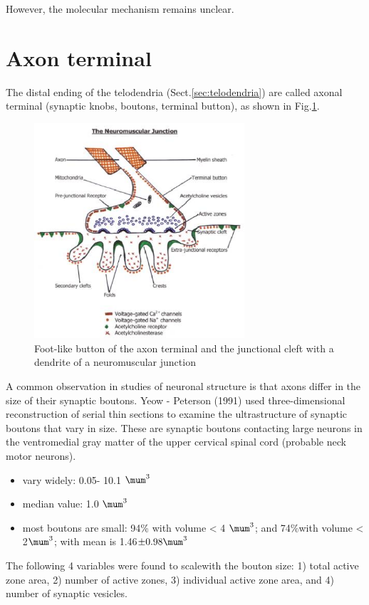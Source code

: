 However, the molecular mechanism remains unclear.

\section{Axon terminal}
\label{sec:axon-terminal}


The distal ending of the telodendria (Sect.\ref{sec:telodendria}) are called
axonal terminal (synaptic knobs, boutons, terminal button), as shown in
Fig.\ref{fig:terminal_button}.

\begin{figure}[htb]
\centerline{\includegraphics[height=8cm]{./images/terminal_button.eps}}
\caption{Foot-like button of the axon terminal and the junctional
  cleft with a dendrite of a neuromuscular junction}\label{fig:terminal_button}
\end{figure} 

A common observation in studies of neuronal structure is that axons differ in
the size of their synaptic boutons. Yeow - Peterson (1991) used
three-dimensional reconstruction of serial thin sections to examine the
ultrastructure of synaptic boutons that vary in size.
These are synaptic boutons contacting large neurons in the ventromedial gray
matter of the upper cervical spinal cord (probable neck motor neurons).
\begin{itemize}
  \item vary widely: 0.05- 10.1 $\mum^3$
  \item median value: 1.0 $\mum^3$
  \item most boutons are small: 94\% with volume < 4 $\mum^3$; and 74\%with
  volume < 2$\mum^3$; with mean is 1.46$\pm 0.98 \mum^3$
\end{itemize}

The following 4 variables were found to scalewith the bouton size:
1) total active zone area, 2) number of active zones, 3) individual active zone
area, and 4) number of synaptic vesicles. 

